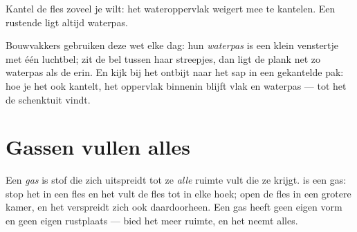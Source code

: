 \begin{omfigure}

{\small Kantel de fles zoveel je wilt: het wateroppervlak weigert mee
te kantelen. Een rustende  ligt altijd waterpas.}
\end{omfigure}

\begin{example}\label{ex:g3:solids-liquids-gases:level}
Bouwvakkers gebruiken deze wet elke dag: hun \emph{waterpas} is een
klein venstertje  met één luchtbel; zit de bel tussen haar
streepjes, dan ligt de plank net zo waterpas als de  erin. En
kijk bij het ontbijt naar het sap in een gekantelde pak: hoe je het
ook kantelt, het oppervlak binnenin blijft vlak en waterpas --- tot
het de schenktuit vindt.
\end{example}

\section{Gassen vullen alles}

\begin{definition}[Gas]\label{def:g3:solids-liquids-gases:gas}
Een \emph{gas} is stof die zich uitspreidt tot ze
\emph{alle} ruimte vult die ze krijgt.  is een gas: stop het in
een fles en het vult de fles tot in elke hoek; open de fles in een
grotere kamer, en het verspreidt zich ook daardoorheen. Een gas heeft
geen eigen vorm en geen eigen rustplaats --- bied het meer ruimte, en
het neemt alles.
\end{definition}

